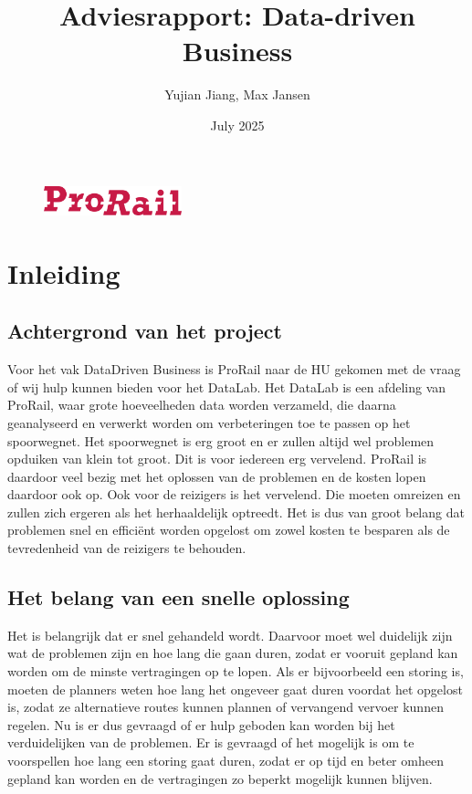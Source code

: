 \documentclass{article}
\title{Adviesrapport: Data-driven Business}
\author{Yujian Jiang, Max Jansen}
\date{July 2025}
\begin{document}
\maketitle

\begin{figure}
    \centering
    \includegraphics[width=4cm]{prorail.png}
\end{figure}

\pagestyle{fancy}

\newpage
\tableofcontents

\newpage
\section{Inleiding}

\subsection{Achtergrond van het project}
Voor het vak DataDriven Business is ProRail naar de HU gekomen met de vraag of wij hulp kunnen bieden voor het DataLab. Het DataLab is een afdeling van ProRail, waar grote hoeveelheden data worden verzameld, die daarna geanalyseerd en verwerkt worden om verbeteringen toe te passen op het spoorwegnet. Het spoorwegnet is erg groot en er zullen altijd wel problemen opduiken van klein tot groot. Dit is voor iedereen erg vervelend. ProRail is daardoor veel bezig met het oplossen van de problemen en de kosten lopen daardoor ook op. Ook voor de reizigers is het vervelend. Die moeten omreizen en zullen zich ergeren als het herhaaldelijk optreedt. Het is dus van groot belang dat problemen snel en efficiënt worden opgelost om zowel kosten te besparen als de tevredenheid van de reizigers te behouden.

\subsection{Het belang van een snelle oplossing}
Het is belangrijk dat er snel gehandeld wordt. Daarvoor moet wel duidelijk zijn wat de problemen zijn en hoe lang die gaan duren, zodat er vooruit gepland kan worden om de minste vertragingen op te lopen. Als er bijvoorbeeld een storing is, moeten de planners weten hoe lang het ongeveer gaat duren voordat het opgelost is, zodat ze alternatieve routes kunnen plannen of vervangend vervoer kunnen regelen. Nu is er dus gevraagd of er hulp geboden kan worden bij het verduidelijken van de problemen. Er is gevraagd of het mogelijk is om te voorspellen hoe lang een storing gaat duren, zodat er op tijd en beter omheen gepland kan worden en de vertragingen zo beperkt mogelijk kunnen blijven.
\end{document}
